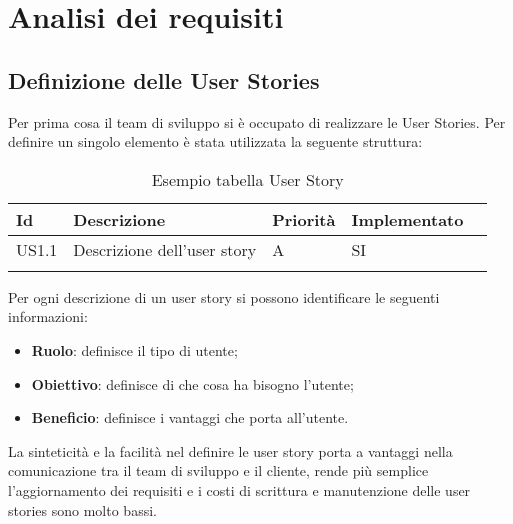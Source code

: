 
\chapter{Analisi dei requisiti}
\label{cap:analisi-requisiti}
\section{Definizione delle User Stories}
Per prima cosa il team di sviluppo si è occupato di realizzare le User Stories. Per definire un singolo elemento è stata utilizzata la seguente struttura:
\begin{longtable} {
		|>{}p{10mm}| 
		|>{}p{70mm}|
		|>{}p{15mm}|
		|>{}p{25mm}|
		>{}p{0mm}}
	\hline
	\textbf{Id} & \textbf{Descrizione} & \textbf{Priorità} & \textbf{Implementato} \\ \hline
	US1.1 & Descrizione dell'user story & A & SI \\ \hline
	\hline
	\caption{Esempio tabella User Story}
\end{longtable}
\noindent
Per ogni descrizione di un user story si possono identificare le seguenti informazioni:
\begin{itemize}
	\item \textbf{Ruolo}: definisce il tipo di utente;
	\item \textbf{Obiettivo}: definisce di che cosa ha bisogno l'utente;
	\item \textbf{Beneficio}: definisce i vantaggi che porta all'utente.
\end{itemize} 
\noindent
La sinteticità e la facilità nel definire le user story porta a vantaggi nella comunicazione tra il team di sviluppo e il cliente, rende più semplice l'aggiornamento dei requisiti e i costi di scrittura e manutenzione delle user stories sono molto bassi.

